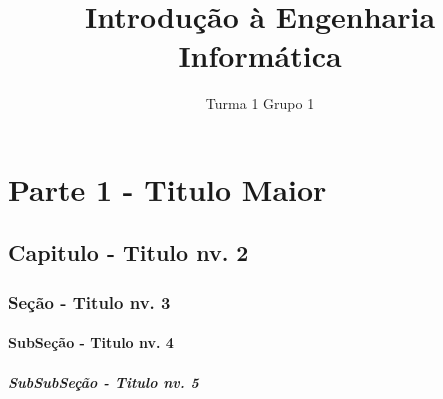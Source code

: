 \documentclass[a4paper, 13pt,twocolumn,twoside]{report}
\title{\textbf{Introdução à Engenharia Informática}}
\author{Turma 1 Grupo 1}
\begin{document}
\maketitle
\tableofcontents

\part{Parte 1 - Titulo Maior}
    \chapter{Capitulo - Titulo nv. 2}
        \section{Seção - Titulo nv. 3}
            \subsection{SubSeção - Titulo nv. 4}
                \subsubsection{SubSubSeção - Titulo nv. 5}
\end{document}
